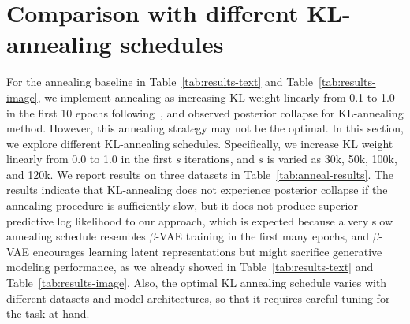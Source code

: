 \documentclass{article} \usepackage{iclr2019_conference,times}
\begin{document}
\begin{table}[h]
    \centering
    \caption{Evaluation of a trained VAE model trained by basic VAE training across 10 different random seeds. Mean values are reported and variance is given in parentheses. IW denotes the approximation to NLL we used in Section~\ref{sec:expresults}. }
    \label{tab:appx-iw-basic}
\end{table}

\section{Comparison with different KL-annealing schedules}\label{apdix:anneal}
For the annealing baseline in Table~\ref{tab:results-text} and Table~\ref{tab:results-image}, we implement annealing as increasing KL weight linearly from 0.1 to 1.0 in the first 10 epochs following~\citep{kim2018semi}, and observed posterior collapse for KL-annealing method. However, this annealing strategy may not be the optimal. In this section, we explore different KL-annealing schedules. Specifically, we increase KL weight linearly from 0.0 to 1.0 in the first $s$ iterations, and $s$ is varied as 30k, 50k, 100k, and 120k. We report results on three datasets in Table~\ref{tab:anneal-results}. The results indicate that KL-annealing does not experience posterior collapse if the annealing procedure is sufficiently slow, but it does not produce superior predictive log likelihood to our approach, which is expected because a very slow annealing schedule resembles $\beta$-VAE training in the first many epochs, and $\beta$-VAE encourages learning latent representations but might sacrifice generative modeling performance, as we already showed in Table~\ref{tab:results-text} and Table~\ref{tab:results-image}. Also, the optimal KL annealing schedule varies with different datasets and model architectures, so that it requires careful tuning for the task at hand.
\end{document}
